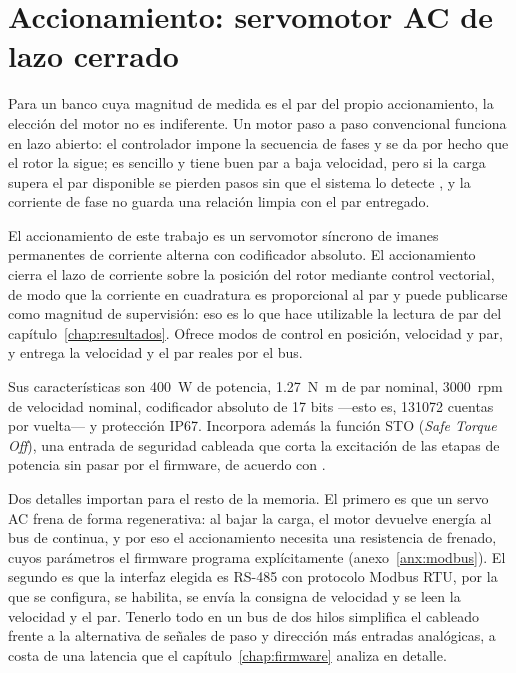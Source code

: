 \section{Accionamiento: servomotor AC de lazo cerrado}

Para un banco cuya magnitud de medida es el par del propio accionamiento, la elección del motor no
es indiferente. Un motor paso a paso convencional funciona en lazo abierto: el controlador impone la
secuencia de fases y se da por hecho que el rotor la sigue; es sencillo y tiene buen par a baja
velocidad, pero si la carga supera el par disponible se pierden pasos sin que el sistema lo detecte
\cite{kenjo1994}, y la corriente de fase no guarda una relación limpia con el par entregado.

El accionamiento de este trabajo es un servomotor síncrono de imanes permanentes de corriente
alterna con codificador absoluto. El accionamiento cierra el lazo de corriente sobre la posición
del rotor mediante control vectorial, de modo que la corriente en cuadratura es proporcional al par
y puede publicarse como magnitud de supervisión: eso es lo que hace utilizable la lectura de par
del capítulo~\ref{chap:resultados}. Ofrece modos de control en posición, velocidad y par, y entrega
la velocidad y el par reales por el bus.

Sus características son \SI{400}{\watt} de potencia, \SI{1.27}{\newton\metre} de par nominal,
\SI{3000}{rpm} de velocidad nominal, codificador absoluto de \num{17} bits ---esto es,
\num{131072} cuentas por vuelta--- y protección IP67. Incorpora además la función STO
(\emph{Safe Torque Off}), una entrada de seguridad cableada que corta la excitación de las etapas de
potencia sin pasar por el firmware, de acuerdo con \cite{iec61800}. 

Dos detalles importan para el resto de la memoria. El primero es que un servo AC frena de forma
regenerativa: al bajar la carga, el motor devuelve energía al bus de continua, y por eso el
accionamiento necesita una resistencia de frenado, cuyos parámetros el firmware programa
explícitamente (anexo~\ref{anx:modbus}). El segundo es que la interfaz elegida es RS-485 con
protocolo Modbus RTU, por la que se configura, se habilita, se envía la consigna de velocidad y se
leen la velocidad y el par. Tenerlo todo en un bus de dos hilos simplifica el cableado frente a la
alternativa de señales de paso y dirección más entradas analógicas, a costa de una latencia que el
capítulo~\ref{chap:firmware} analiza en detalle.

